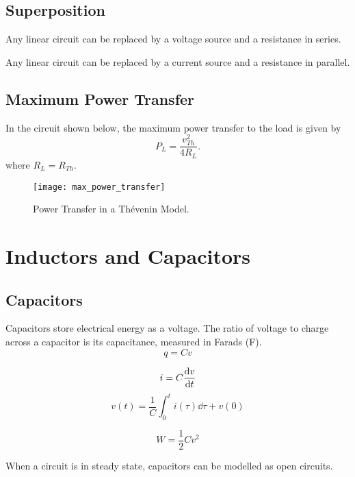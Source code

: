 \documentclass{article}
\begin{document}
\subsection{Superposition}
\begin{theorem}
    Any linear circuit can be replaced by a voltage source and a resistance in series.
\end{theorem}
\begin{theorem}
    Any linear circuit can be replaced by a current source and a resistance in parallel.
\end{theorem}
\subsection{Maximum Power Transfer}
In the circuit shown below, the maximum power transfer to the load is given by
\begin{equation*}
    P_L = \frac{v_{Th}^2}{4R_L}.
\end{equation*}
where $R_L = R_{Th}$.
\begin{figure}[H]
    \centering
    \texttt{[image: max\_power\_transfer]}
    \caption{Power Transfer in a Thévenin Model.}
\end{figure}
\newpage
\section{Inductors and Capacitors}
\subsection{Capacitors}
\begin{definition}
    Capacitors store electrical energy as a voltage. The ratio of voltage 
    to charge across a capacitor is its capacitance, measured in Farads (\si{\farad}).
    \begin{equation*}
        q = C v
    \end{equation*}
\end{definition}
\begin{definition}[VI Relationship]
    \begin{equation*}
        i = C \dv{v}{t}
    \end{equation*}
    \begin{equation*}
        v(t) = \frac{1}{C} \int_0^t i(\tau) \dd{\tau} + v(0)
    \end{equation*}
\end{definition}
\begin{definition}
    \begin{equation*}
        W = \frac{1}{2}Cv^2
    \end{equation*}
\end{definition}
\begin{theorem}
    When a circuit is in steady state, capacitors can be modelled as open circuits.
\end{theorem}
\end{document}
